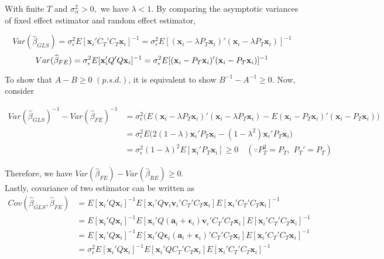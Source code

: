 \documentclass[11pt]{article}
\begin{document}
With finite $T$ and $\sigma_\alpha^2 >0,$ we have $\lambda<1$. By comparing the asymptotic variances of fixed effect estimator and random effect estimator, 

\[
Var(\widehat{\beta}_{GLS}) = \sigma_\epsilon^2 E[\mathbf{x}_i' C_T'C_T \mathbf{x}_i]^{-1} = \sigma_\epsilon^2 E[(\mathbf{x}_i - \lambda P_T \mathbf{x}_i)'(\mathbf{x}_i - \lambda P_T \mathbf{x}_i)]^{-1}
\] 
\[
Var(\widehat{\beta}_{FE}) = \sigma_\epsilon^2 E[\mathbf{x}_i' Q'Q \mathbf{x}_i]^{-1} = \sigma_\epsilon^2 E[(\mathbf{x}_i - P_T \mathbf{x}_i)'(\mathbf{x}_i - P_T \mathbf{x}_i)]^{-1}\\
\] 


To show that $A-B \geq 0\,\, (p.s.d.)$, it is equivalent to show $B^{-1} - A^{-1} \geq 0$. Now, consider

\begin{align*}
Var(\widehat{\beta}_{GLS})^{-1} - Var(\widehat{\beta}_{FE})^{-1} & = \sigma_\epsilon^2 \big( E(\mathbf{x}_i - \lambda P_T \mathbf{x}_i)' (\mathbf{x}_i - \lambda P_T \mathbf{x}_i) - E(\mathbf{x}_i - P_T\mathbf{x}_i)'(\mathbf{x}_i - P_T \mathbf{x}_i)  \big)\\
&= \sigma_\epsilon^2 E\big( 2(1-\lambda) \mathbf{x}_i'P_T \mathbf{x}_i - (1-\lambda^2) \mathbf{x}_i' P_T \mathbf{x}_i  \big) \\
&= \sigma_\epsilon^2 (1-\lambda)^2 E[\mathbf{x}_i' P_T \mathbf{x}_i] \geq 0 \quad (\because P_T^2 = P_T,\,\, P_T' = P_T)
\end{align*}

Therefore, we have $Var(\widehat{\beta}_{FE}) - Var(\widehat{\beta}_{RE}) \geq 0$. \\

Lastly, covariance of two estimator can be written as
\begin{align*}
Cov(\widehat{\beta}_{GLS}, \widehat{\beta}_{FE}) &= E[\mathbf{x}_i' Q \mathbf{x}_i]^{-1} E[\mathbf{x}_i' Q \mathbf{v}_i \mathbf{v}_i' C_T' C_T \mathbf{x}_i] E[\mathbf{x}_i' C_T'C_T \mathbf{x}_i]^{-1}\\
& = E[\mathbf{x}_i' Q \mathbf{x}_i]^{-1} E[\mathbf{x}_i' Q (\mathbf{a}_i + \mathbf{\epsilon}_i)\mathbf{v}_i' C_T' C_T \mathbf{x}_i] E[\mathbf{x}_i' C_T'C_T \mathbf{x}_i]^{-1}\\
& = E[\mathbf{x}_i' Q \mathbf{x}_i]^{-1} E[\mathbf{x}_i' Q  \mathbf{\epsilon}_i(\mathbf{a}_i+\mathbf{\epsilon}_i)' C_T' C_T \mathbf{x}_i] E[\mathbf{x}_i' C_T'C_T \mathbf{x}_i]^{-1}\\
& = \sigma_\epsilon^2 E[\mathbf{x}_i' Q \mathbf{x}_i]^{-1} E[\mathbf{x}_i' Q  C_T' C_T \mathbf{x}_i] E[\mathbf{x}_i' C_T'C_T \mathbf{x}_i]^{-1}\\
\end{align*}
\end{document}
